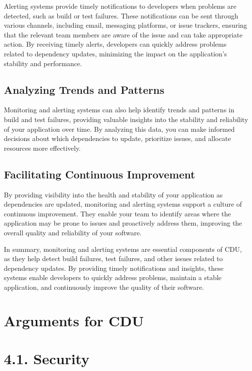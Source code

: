 \documentclass[10pt]{article}
\begin{document}
Alerting systems provide timely notifications to developers when problems are detected, such as build or test failures. These notifications can be sent through various channels, including email, messaging platforms, or issue trackers, ensuring that the relevant team members are aware of the issue and can take appropriate action. By receiving timely alerts, developers can quickly address problems related to dependency updates, minimizing the impact on the application's stability and performance.

\subsection*{Analyzing Trends and Patterns}

Monitoring and alerting systems can also help identify trends and patterns in build and test failures, providing valuable insights into the stability and reliability of your application over time. By analyzing this data, you can make informed decisions about which dependencies to update, prioritize issues, and allocate resources more effectively.

\subsection*{Facilitating Continuous Improvement}

By providing visibility into the health and stability of your application as dependencies are updated, monitoring and alerting systems support a culture of continuous improvement. They enable your team to identify areas where the application may be prone to issues and proactively address them, improving the overall quality and reliability of your software.

In summary, monitoring and alerting systems are essential components of CDU, as they help detect build failures, test failures, and other issues related to dependency updates. By providing timely notifications and insights, these systems enable developers to quickly address problems, maintain a stable application, and continuously improve the quality of their software.

\section*{Arguments for CDU}

\section*{4.1. Security}
\end{document}
